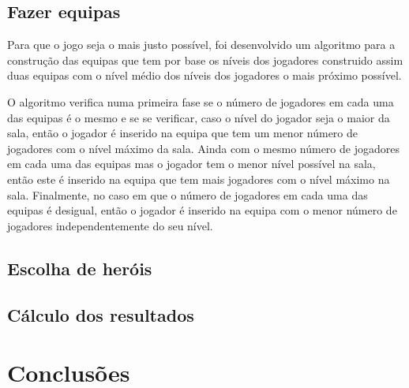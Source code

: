 \documentclass[a4paper]{article}
\begin{document}
\subsection{Fazer equipas}
\label{sec:3.3}

\hspace{3mm} Para que o jogo seja o mais justo possível, foi desenvolvido um algoritmo para a construção das equipas que tem por base os níveis dos jogadores construido assim duas equipas com o nível médio dos níveis dos jogadores o mais próximo possível.

\par O algoritmo verifica numa primeira fase se o número de jogadores em cada uma das equipas é o mesmo e se se verificar, caso o nível do jogador seja o maior da sala, então o jogador é inserido na equipa que tem um menor número de jogadores com o nível máximo da sala. Ainda com o mesmo número de jogadores em cada uma das equipas mas o jogador tem o menor nível possível na sala, então este é inserido na equipa que tem mais jogadores com o nível máximo na sala. Finalmente, no caso em que o número de jogadores em cada uma das equipas é desigual, então o jogador é inserido na equipa com o menor número de jogadores independentemente do seu nível.

\subsection{Escolha de heróis}
\label{sec:3.4}
\hspace{3mm} 

\subsection{Cálculo dos resultados}
\label{sec:3.5}
\hspace{3mm} 

\pagebreak


\section{Conclusões}
\label{sec:4}

\hspace{3mm} 
\end{document}
